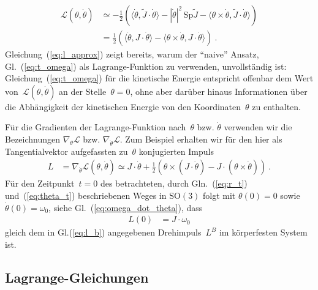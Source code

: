 \documentclass[10pt,a4paper]{article}
\begin{document}
\begin{align}
\label{eq:l_approx}
	\mathcal{L}(\theta, \dot{\theta})
	&\simeq
	-\frac{1}{2}\left(
		\langle
			\dot{\theta},
			\tilde{J}\cdot\dot{\theta}
		\rangle
		-
		|\dot{\theta}|^2\,
		\mathrm{Sp}\tilde{J}
		-
		\langle
		\theta\times\dot{\theta},
		\tilde{J}\cdot\dot{\theta}
		\rangle		
	\right)
	\nonumber\\
	&=
	\frac{1}{2}\left(
		\langle
			\dot{\theta},
			J\cdot\dot{\theta}
		\rangle
		-
		\langle
			\theta\times\dot{\theta},
			J\cdot\dot{\theta}
		\rangle
	\right)
	\ .
\end{align}
Gleichung~(\ref{eq:l_approx}) zeigt bereits, warum der ``naive'' Ansatz, Gl.~(\ref{eq:t_omega}) als Lagrange-Funktion zu verwenden, unvollständig ist:
Gleichung~(\ref{eq:t_omega}) für die kinetische Energie entspricht offenbar dem Wert von~$\mathcal{L}(\theta, \dot{\theta})$ an der Stelle~$\theta=0$, ohne aber darüber hinaus Informationen über die Abhängigkeit der kinetischen Energie von den Koordinaten~$\theta$ zu enthalten.


Für die Gradienten der Lagrange-Funktion nach~$\theta$ bzw. $\dot{\theta}$ verwenden wir die Bezeichnungen $\nabla_{\theta}\mathcal{L}$ bzw. $\nabla_{\dot{\theta}}\mathcal{L}$.
Zum Beispiel erhalten wir für den hier als Tangentialvektor aufgefassten zu~$\theta$ konjugierten Impuls
\begin{align}
\label{eq:l_conj}
	L &= \nabla_{\dot{\theta}}\mathcal{L}(\theta, \dot{\theta})
	\simeq
	J\cdot\dot{\theta}
	+
	\frac{1}{2}
	\left(
	\theta\times(J\cdot\dot{\theta})
	-J\cdot
	(\theta\times\dot{\theta})
	\right)
	\ .
\end{align}
Für den Zeitpunkt~$t=0$ des betrachteten, durch Gln.~(\ref{eq:r_t}) und~(\ref{eq:theta_t}) beschriebenen Weges in $\mathrm{SO}(3)$ folgt mit $\theta(0)=0$ sowie $\dot{\theta}(0)=\omega_0$, siehe Gl.~(\ref{eq:omega_dot_theta}), dass 
\begin{align}
	L(0) &= J\cdot\omega_0
\end{align}
gleich dem in Gl.(\ref{eq:l_b}) angegebenen Drehimpuls~$L^B$ im körperfesten System ist.

\subsection{Lagrange-Gleichungen}
\end{document}
